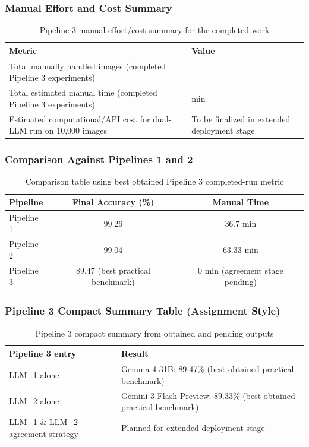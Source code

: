 \documentclass[12pt,a4paper]{article}
\begin{document}
\subsubsection{Manual Effort and Cost Summary}

\begin{table}[H]
\centering
\begin{tabularx}{\textwidth}{>{\raggedright\arraybackslash}X >{\raggedright\arraybackslash}X}
\toprule
Metric & Value \\
\midrule
Total manually handled images (completed Pipeline 3 experiments) & 0 \\
Total estimated manual time (completed Pipeline 3 experiments) & 0 min \\
Estimated computational/API cost for dual-LLM run on 10,000 images & To be finalized in extended deployment stage \\
\bottomrule
\end{tabularx}
\caption{Pipeline 3 manual-effort/cost summary for the completed work}
\end{table}

\subsubsection{Comparison Against Pipelines 1 and 2}

\begin{table}[H]
\centering
\begin{tabular}{lcc}
\toprule
Pipeline & Final Accuracy (\%) & Manual Time \\
\midrule
Pipeline 1 & 99.26 & 36.7 min \\
Pipeline 2 & 99.04 & 63.33 min \\
Pipeline 3 & 89.47 (best practical benchmark) & 0 min (agreement stage pending) \\
\bottomrule
\end{tabular}
\caption{Comparison table using best obtained Pipeline 3 completed-run metric}
\end{table}

\subsubsection{Pipeline 3 Compact Summary Table (Assignment Style)}

\begin{table}[H]
\centering
\begin{tabularx}{\textwidth}{>{\raggedright\arraybackslash}X >{\raggedright\arraybackslash}X}
\toprule
Pipeline 3 entry & Result \\
\midrule
LLM\_1 alone & Gemma 4 31B: 89.47\% (best obtained practical benchmark) \\
LLM\_2 alone & Gemini 3 Flash Preview: 89.33\% (best obtained practical benchmark) \\
LLM\_1 \& LLM\_2 agreement strategy & Planned for extended deployment stage \\
\bottomrule
\end{tabularx}
\caption{Pipeline 3 compact summary from obtained and pending outputs}
\end{table}
\end{document}
